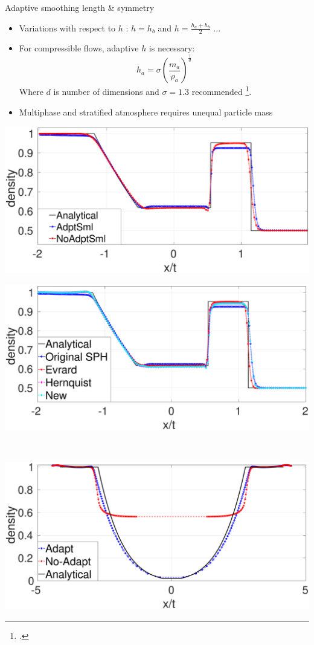 \documentclass{beamer}
\begin{document}
\begin{frame}{Adaptive smoothing length \& symmetry}
\begin{itemize}
\item Variations with respect to $h$ :
$h=h_b$ and $h= \frac{h_a+h_b}{2}$ ...
\item For compressible flows, adaptive $h$ is necessary:
\begin{equation}
h_a = \sigma \left(\frac{m_a}{\rho_a}\right)^{\frac{1}{d}}
\end{equation}
Where $d$ is number of dimensions and $\sigma=1.3 $ recommended  \footcite{gingold1978binary}.
\item Multiphase and stratified atmosphere requires unequal particle mass
\end{itemize}
\begin{minipage}{.43\textwidth}
        \centering
        \includegraphics[width=0.88 \textwidth]{./Chapter-3/Figures/Adapt-NoAdapt-NoSMDM}
\end{minipage}%
\begin{minipage}{.43\textwidth}
        \centering
        \includegraphics[width=0.88 \textwidth]{./Chapter-3/Figures/SM-Adapt-MEs}
\end{minipage}%
\\
\center
\begin{minipage}{.43\textwidth}
        \centering
        \includegraphics[width=0.88 \textwidth]{./Chapter-3/Figures/Sjogreen-adptVSno-d}

\end{minipage}
\end{frame}
\end{document}
